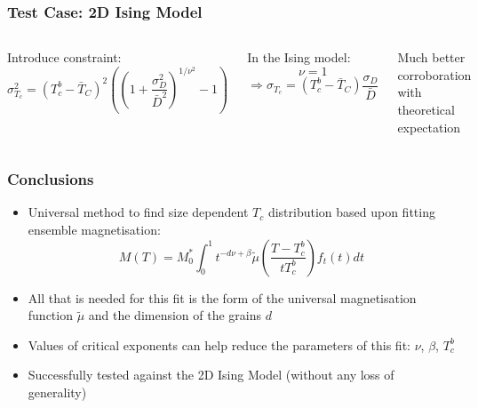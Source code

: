 \documentclass{beamer}
\begin{document}
\begin{frame}
	\frametitle{Test Case: 2D Ising Model}
	\begin{columns}
	\column{7cm}
		Introduce constraint\footnotemark[5]:
		$$
		\sigma_{T_c}^2 = (T_c^b - \bar{T}_C)^2\left(\left(1 + \frac{\sigma_D^2}{\bar{D}^2}\right)^{1/\nu^2}-1\right)
		$$

		In the Ising model:
		$$
		\nu = 1
		$$
		$$
		\Rightarrow \sigma_{T_c} = (T_c^b - \bar{T}_C)\frac{\sigma_D}{\bar{D}}
		$$
		\begin{center}\vspace{2mm}

		Much better corroboration with theoretical expectation
		\end{center}
	\column{5cm}

		\includegraphics[width=4.5cm]{Images/constr}
	\end{columns}
\end{frame}

\begin{frame}
	\frametitle{Conclusions}
	\small{
	\begin{itemize}
		\item{Universal method to find size dependent $T_c$ distribution based upon fitting ensemble magnetisation:}
		$$
		M(T) = M_0^*\int_0^1 t^{-d\nu +\beta} \tilde{\mu}\left(\frac{T-T_c^b}{tT_c^b}\right) f_t(t) dt
		$$
		\item{All that is needed for this fit is the form of the universal magnetisation function $\tilde{\mu}$ and the dimension of the grains $d$}
		\item{Values of critical exponents can help reduce the parameters of this fit: $\nu$, $\beta$, $T_c^b$}
		\item{Successfully tested against the 2D Ising Model (without any loss of generality)}
	\end{itemize}}
\end{frame}
\end{document}
